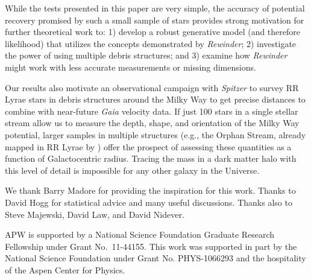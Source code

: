 \documentclass{emulateapj}
\begin{document}
While the tests presented in this paper are very simple, the accuracy of potential recovery promised by such a small sample of stars 
provides strong motivation for further theoretical work to: 1) develop a robust generative model (and therefore likelihood) that utilizes the concepts demonstrated by \emph{Rewinder}; 2) investigate the power of using multiple debris structures; and 3) examine how \emph{Rewinder} might work with less accurate measurements or missing dimensions. 

Our results also motivate an observational campaign with {\it Spitzer} to survey RR Lyrae stars in debris structures around the Milky Way to get precise distances to combine with near-future {\it Gaia} velocity data. 
If just 100 stars in a single stellar stream allow us to measure the depth, shape, and orientation of the Milky Way potential, larger samples in multiple structures (e.g., the Orphan Stream, already mapped in RR Lyrae by \citet{sesar13}) offer the prospect of assessing these quantities as a function of Galactocentric radius. Tracing the mass in a dark matter halo with this level of detail is impossible for any other galaxy in the Universe.

\acknowledgments
We thank Barry Madore for providing the inspiration for this work. Thanks to 
David Hogg for statistical advice and many useful discussions. Thanks also to
Steve Majewski, David Law, and David Nidever.

APW is supported by a National Science Foundation Graduate Research
Fellowship under Grant No.\ 11-44155. This work was supported in part by 
the National Science Foundation under Grant No. PHYS-1066293 and the 
hospitality of the Aspen Center for Physics.

%

\end{document}
